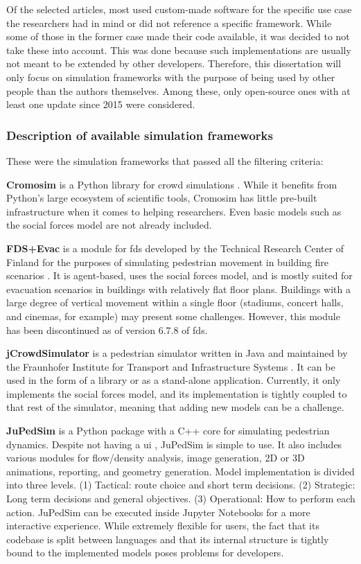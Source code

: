 \documentclass[twoside, 11pt]{article}
\begin{document}
Of the selected articles, most used custom-made software for the specific use case the researchers had in mind or did not reference a specific framework. While some of those in the former case made their code available, it was decided to not take these into account. This was done because such implementations are usually not meant to be extended by other developers. Therefore, this dissertation will only focus on simulation frameworks with the purpose of being used by other people than the authors themselves. Among these, only open-source ones with at least one update since 2015 were considered. 

\subsubsection{Description of available simulation frameworks}

These were the simulation frameworks that passed all the filtering criteria:

\textbf{Cromosim} is a Python library for crowd simulations \cite{cromosim}. While it benefits from Python's large ecosystem of scientific tools, Cromosim has little pre-built infrastructure when it comes to helping researchers. Even basic models such as the social forces model are not already included.

\textbf{FDS+Evac} is a module for \gls{fds} developed by the Technical Research Center of Finland for the purposes of simulating pedestrian movement in building fire scenarios \cite{korhonenFireDynamicsSimulator2009}. It is agent-based, uses the social forces model, and is mostly suited for evacuation scenarios in buildings with relatively flat floor plans. Buildings with a large degree of vertical movement within a single floor (stadiums, concert halls, and cinemas, for example) may present some challenges. However, this module has been discontinued as of version 6.7.8 of \gls{fds}.

\textbf{jCrowdSimulator} is a pedestrian simulator written in Java and maintained by the Fraunhofer Institute for Transport and Infrastructure Systems \cite{meinert2019simulation}. It can be used in the form of a library or as a stand-alone application. Currently, it only implements the social forces model, and its implementation is tightly coupled to that rest of the simulator, meaning that adding new models can be a challenge.

\textbf{JuPedSim} is a Python package with a C++ core for simulating pedestrian dynamics. Despite not having a \gls{ui} \cite{kemlohwagoumJuPedSimOpenFramework2015}, JuPedSim is simple to use. It also includes various modules for flow/density analysis, image generation, 2D or 3D animations, reporting, and geometry generation. Model implementation is divided into three levels. (1) Tactical: route choice and short term decisions. (2) Strategic: Long term decisions and general objectives. (3) Operational: How to perform each action. JuPedSim can be executed inside Jupyter Notebooks for a more interactive experience. While extremely flexible for users, the fact that its codebase is split between languages and that its internal structure is tightly bound to the implemented models poses problems for developers.
\end{document}
